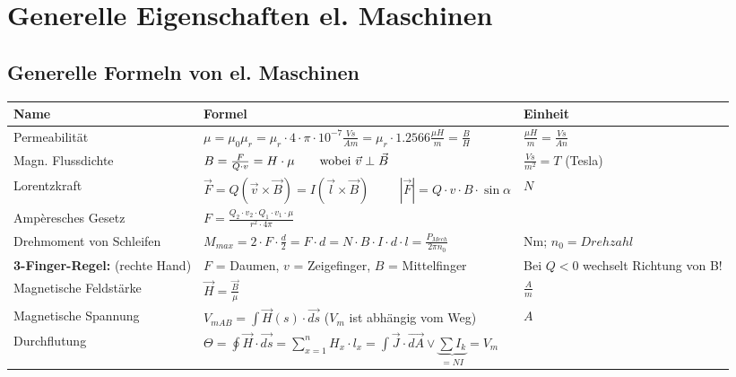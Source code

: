 \section{Generelle Eigenschaften el. Maschinen}
    \subsection{Generelle Formeln von el. Maschinen}
        \renewcommand{\arraystretch}{2}
        \begin{tabular}[c]{ | p{5cm} | p{8cm} | p{4cm} | }
            \hline
            \textbf{Name} &
            \textbf{Formel} &
            \textbf{Einheit} \\
            \hline
            Permeabilität &
            $\mu = \mu_0 \mu_r = \mu_r \cdot 4 \cdot \pi \cdot 10^{-7} \frac{Vs}{Am} = \mu_r \cdot 1.2566 \frac{\mu H}{m}=\frac{B}{H}$ &
            $\frac{\mu H}{m}=\frac{Vs}{An}$ \\
            \hline
            Magn. Flussdichte &
            $B = \frac{F}{Q \cdot v} = H \cdot \mu \text{\qquad wobei } \vec{v} \perp \vec{B}$ &
            $\frac{Vs}{m^2} = T$ (Tesla) \\
            \hline
            Lorentzkraft &
            $\vec{F} = Q (\vec{v} \times \vec{B})=I(\vec{l}\times \vec{B}) \hspace{1cm} |\vec{F}| = Q \cdot v \cdot B \cdot \sin\alpha$ &
            $N$ \\
            Ampèresches Gesetz &
            $F=\frac{Q_2 \cdot v_2 \cdot Q_1 \cdot v_1 \cdot \mu}{r^2 \cdot 4\pi}$ &
            \\
            \hline
            Drehmoment von Schleifen &
            $M_{max} = 2 \cdot F \cdot \frac{d}{2}= F \cdot d = N \cdot B \cdot I \cdot d \cdot l = \frac{P_{Mech}}{2 \pi n_0} $ &
            Nm; $n_0= Drehzahl$ \\
            \hline
            \textbf{3-Finger-Regel:} (rechte Hand) &
            $F$ = Daumen, $v$ = Zeigefinger, $B$ = Mittelfinger &
            Bei $Q < 0$ wechselt Richtung von B! \\
            \hline
            Magnetische Feldstärke &
            $\vec{H} = \frac{ \vec{B}}{\mu }$ &
            $\frac{A}{m}$ \\
            Magnetische Spannung &
            $V_{mAB} = \int\limits \vec{H}(s) \cdot \vec{ds}$ ($V_m$ ist abhängig vom Weg) &
            $A$ \\
            \hline
            Durchflutung &
            $\Theta = \oint\vec{H} \cdot \vec{ds} = \sum\limits_{x=1}^n H_x \cdot l_x = \int\limits \vec{J} \cdot \vec{dA} \vee \underbrace{\sum I_k}_{= N I} = V_m$ &

\end{tabular}
